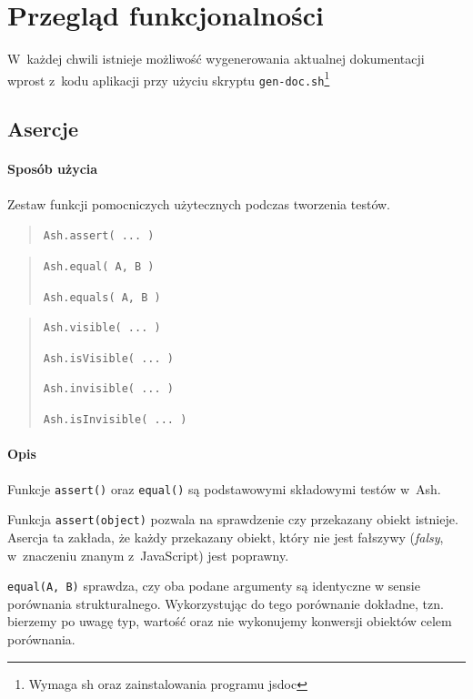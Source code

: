 \documentclass[brudnopis]{xmgr}
\begin{document}
\chapter{Przegląd funkcjonalności}

W~każdej chwili istnieje możliwość wygenerowania aktualnej dokumentacji wprost z~kodu aplikacji przy użyciu skryptu \texttt{gen-doc.sh}\footnote{Wymaga sh oraz zainstalowania programu jsdoc}

\section{Asercje}

\subsubsection{Sposób użycia}

Zestaw funkcji pomocniczych użytecznych podczas tworzenia testów.

\begin{quote}
  \texttt{Ash.assert( ... )} 
\end{quote}

\begin{quote}
  \texttt{Ash.equal( A, B )}

  \texttt{Ash.equals( A, B )} 
\end{quote}

\begin{quote}
  \texttt{Ash.visible( ... )} 

  \texttt{Ash.isVisible( ... )}

  \texttt{Ash.invisible( ... )}

  \texttt{Ash.isInvisible( ... )}
\end{quote}

\subsubsection{Opis}

Funkcje \texttt{assert()} oraz \texttt{equal()} są podstawowymi składowymi testów w~Ash.

Funkcja \texttt{assert(object)} pozwala na sprawdzenie czy przekazany obiekt istnieje. Asercja ta zakłada, że każdy przekazany obiekt, który nie jest fałszywy (\textit{falsy}, w~znaczeniu znanym z~JavaScript) jest poprawny. 

\texttt{equal(A, B)} sprawdza, czy oba podane argumenty są identyczne w sensie porównania strukturalnego. Wykorzystując do tego porównanie dokładne, tzn. bierzemy po uwagę typ, wartość oraz nie wykonujemy konwersji obiektów celem porównania.
\end{document}
